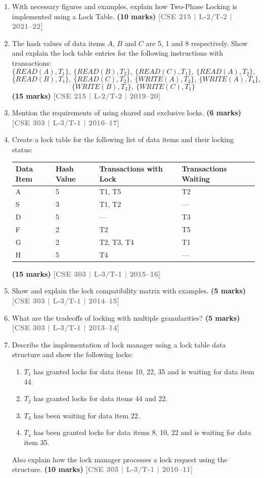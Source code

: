 \documentclass[12pt]{article}
\newcommand{\yr}[1]{\hfill\textcolor{gray}{\small\textbf{[#1]}}}
\newcommand{\mk}[1]{\textcolor{orange!70!black}{\small\textbf{(#1 marks)}}}
\begin{document}
\begin{enumerate}

\item With necessary figures and examples, explain how Two-Phase Locking is implemented using a Lock Table.
\mk{10} \yr{CSE 215 | L-2/T-2 | 2021--22}


\item The hash values of data items $A$, $B$ and $C$ are 5, 1 and 8 respectively. Show and explain the lock table entries for the following instructions with transactions:
\[\{READ(A), T_1\},\ \{READ(B), T_2\},\ \{READ(C), T_1\},\ \{READ(A), T_2\},\]
\[\{READ(B), T_1\},\ \{READ(C), T_2\},\ \{WRITE(A), T_3\},\ \{WRITE(A), T_4\},\]
\[\{WRITE(B), T_3\},\ \{WRITE(C), T_1\}\]
\mk{15} \yr{CSE 215 | L-2/T-2 | 2019--20}


\item Mention the requirements of using shared and exclusive locks.
\mk{6} \yr{CSE 303 | L-3/T-1 | 2016--17}


\item Create a lock table for the following list of data items and their locking status:

\medskip
\begin{center}
\small
\begin{tabular}{llll}
\toprule
\textbf{Data Item} & \textbf{Hash Value} & \textbf{Transactions with Lock} & \textbf{Transactions Waiting}\\
\midrule
A & 5 & T1, T5 & T2\\
S & 3 & T1, T2 & ---\\
D & 5 & --- & T3\\
F & 2 & T2 & T5\\
G & 2 & T2, T3, T4 & T1\\
H & 5 & T4 & ---\\
\bottomrule
\end{tabular}
\end{center}
\mk{15} \yr{CSE 303 | L-3/T-1 | 2015--16}


\item Show and explain the lock compatibility matrix with examples.
\mk{5} \yr{CSE 303 | L-3/T-1 | 2014--15}


\item What are the tradeoffs of locking with multiple granularities?
\mk{5} \yr{CSE 303 | L-3/T-1 | 2013--14}


\item Describe the implementation of lock manager using a lock table data structure and show the following locks:
\begin{enumerate}
  \item $T_1$ has granted locks for data items 10, 22, 35 and is waiting for data item 44.
  \item $T_2$ has granted locks for data items 44 and 22.
  \item $T_3$ has been waiting for data item 22.
  \item $T_4$ has been granted locks for data items 8, 10, 22 and is waiting for data item 35.
\end{enumerate}
Also explain how the lock manager processes a lock request using the structure.
\mk{10} \yr{CSE 303 | L-3/T-1 | 2010--11}


\end{enumerate}
\end{document}
